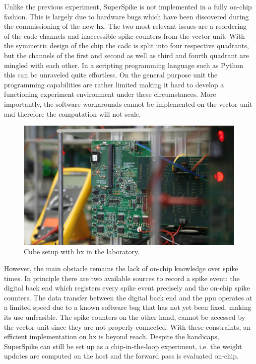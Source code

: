 Unlike the previous experiment, SuperSpike is not implemented in a fully on-chip fashion. This is largely due to hardware bugs which have been discovered during the commissioning of the new \gls{hx}. The two most relevant issues are a reordering of the \gls{cadc} channels and inaccessible spike counters from the vector unit. With the symmetric design of the chip the \gls{cadc} is split into four respective quadrants, but the channels of the first and second as well as third and fourth quadrant are mingled with each other. In a scripting programming language such as Python this can be unraveled quite effortless. On the general purpose unit the programming capabilities are rather limited making it hard to develop a functioning experiment environment under these circumstances. More importantly, the software workarounds cannot be implemented on the vector unit and therefore the computation will not scale.

\begin{figure}[htb!]
	\centering
	\includegraphics[width=\textwidth]{figures/hxsetup_img2.jpg}
	\caption[Cube setup with \gls{hx}.]{Cube setup with \gls{hx} in the laboratory.}
	\label{cubesetupinlab}
\end{figure}

However, the main obstacle remains the lack of on-chip knowledge over spike times. In principle there are two available sources to record a spike event: the digital back end which registers every spike event precisely and the on-chip spike counters. The data transfer between the digital back end and the \gls{ppu} operates at a limited speed due to a known software bug that has not yet been fixed, making its use unfeasible. The spike counters on the other hand, cannot be accessed by the vector unit since they are not properly connected. With these constraints, an efficient implementation on \gls{hx} is beyond reach. Despite the handicaps, SuperSpike can still be set up as a chip-in-the-loop experiment, i.e. the weight updates are computed on the host and the forward pass is evaluated on-chip. 


